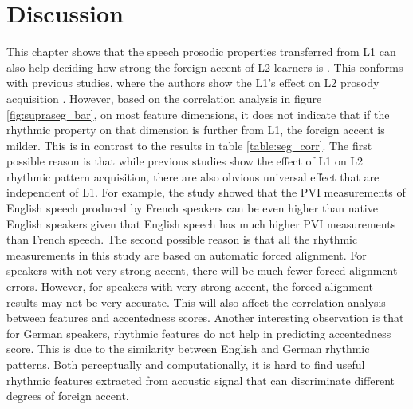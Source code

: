 \section{Discussion}

This chapter shows that the speech prosodic properties transferred from L1 can also help deciding how strong the foreign accent of L2 learners is . This conforms with previous studies, where the authors show the L1's effect on L2 prosody acquisition \citep{rasier2007prosodic,stockmal2005measures,white2007calibrating,li2014l2,ordin2015acquisition}. However, based on the correlation analysis in figure \ref{fig:supraseg_bar}, on most feature dimensions, it does not indicate that if the rhythmic property on that dimension is further from L1, the foreign accent is milder. This is in contrast to the results in table \ref{table:seg_corr}. The first possible reason is that while previous studies show the effect of L1 on L2 rhythmic pattern acquisition, there are also obvious universal effect that are independent of L1. For example, the study \cite{ordin2015acquisition} showed that the PVI measurements of English speech produced by French speakers can be even higher than native English speakers given that English speech has much higher PVI measurements than French speech. The second possible reason is that all the rhythmic measurements in this study are based on automatic forced alignment. For speakers with not very strong accent, there will be much fewer forced-alignment errors. However, for speakers with very strong accent, the forced-alignment results may not be very accurate. This will also affect the correlation analysis between features and accentedness scores. Another interesting observation is that for German speakers, rhythmic features do not help in predicting accentedness score. This is due to the similarity between English and German rhythmic patterns. Both perceptually and computationally, it is hard to find useful rhythmic features extracted from acoustic signal that can discriminate different degrees of foreign accent.

